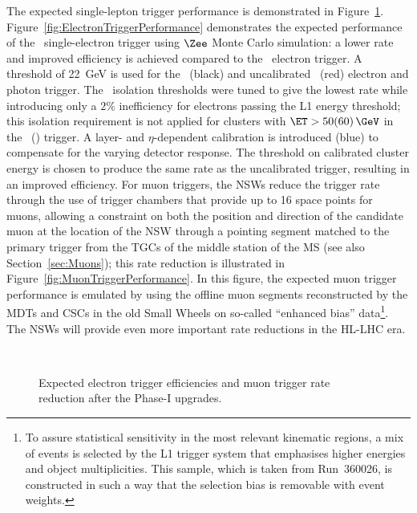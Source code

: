\documentclass[cernpreprint, atlasdraft=false, UKenglish,british,orcidlogo, texmf, orcidlogo]{atlasdoc}
\begin{document}
The expected single-lepton trigger performance is demonstrated in Figure~\ref{fig:LeptonTriggerPerformance}. Figure~\ref{fig:ElectronTriggerPerformance} demonstrates the expected performance of the \RunThr\ single-electron trigger using $\Zee$ Monte Carlo simulation: a lower rate and improved efficiency is achieved compared to the \RunTwo\ electron trigger. A threshold of \SI{22}{\GeV} is used for the \RunTwo\ (black) and uncalibrated \RunThr\ (red) electron and photon trigger. The \RunThr\ isolation thresholds were tuned to give the lowest rate while introducing only a $2\%$ inefficiency for electrons passing the \gls{L1} energy threshold; this isolation requirement is not applied for clusters with $\ET > 50 (60)\,\GeV$ in the \RunTwo\ (\RunThr) trigger. A layer- and $\eta$-dependent calibration is introduced (blue) to compensate for the varying detector response. The threshold on calibrated cluster energy is chosen to produce the same rate as the uncalibrated trigger, resulting in an improved efficiency. For muon triggers, the \glspl{NSW} reduce the trigger rate through the use of trigger chambers that provide up to \num{16} space points for muons, allowing a constraint on both the position and direction of the candidate muon at the location of the \gls{NSW} through a pointing segment matched to the primary trigger from the \glspl{TGC} of the middle station of the \gls{MS} (see also Section~\ref{sec:Muons}); this rate reduction is illustrated in Figure~\ref{fig:MuonTriggerPerformance}. In this figure, the expected \RunThr muon trigger performance is emulated by using the offline muon segments reconstructed by the \glspl{MDT} and \glspl{CSC} in the old Small Wheels on so-called ``enhanced bias'' data\footnote{To assure statistical sensitivity in the most relevant kinematic regions, a mix of events is selected by the \gls{L1} trigger system that emphasises higher energies and object multiplicities. This sample, which is taken from Run~360026, is constructed in such a way that the selection bias is removable with event weights.}. The \glspl{NSW} will provide even more important rate reductions in the \gls{HL-LHC} era.
 
\begin{figure}[!hp]
 
\centering
{}
\\
\centering
{}
 
\caption{Expected \protect{} electron trigger efficiencies and \protect{} muon trigger rate reduction after the Phase-I upgrades.}
\label{fig:LeptonTriggerPerformance}
\end{figure}
 
\end{document}
